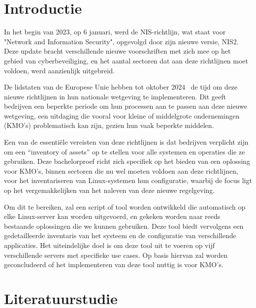 
\section{Introductie}%
\label{sec:introductie}

In het begin van 2023, op 6 januari, werd de NIS-richtlijn, wat staat voor "Network and Information Security", opgevolgd door zijn nieuwe versie, NIS2.
Deze update bracht verschillende nieuwe voorschriften met zich mee op het gebied van cyberbeveiliging, en het aantal sectoren dat aan deze richtlijnen moet voldoen, werd aanzienlijk uitgebreid.

De lidstaten van de Europese Unie hebben tot oktober 2024~\autocite{NIS2Directive2022} de tijd om deze nieuwe richtlijnen in hun nationale wetgeving te implementeren.
Dit geeft bedrijven een beperkte periode om hun processen aan te passen aan deze nieuwe wetgeving, een uitdaging die vooral voor kleine of middelgrote ondernemingen (KMO's) problematisch kan zijn, gezien hun vaak beperkte middelen.

Een van de essenti\"ele vereisten van deze richtlijnen is dat bedrijven verplicht zijn om een ``inventory of assets'' op te stellen voor alle systemen en operaties die ze gebruiken.
Deze bachelorproef richt zich specifiek op het bieden van een oplossing voor KMO's, binnen sectoren die nu wel moeten voldoen aan deze richtlijnen, voor het inventariseren van Linux-systemen hun configuratie, waarbij de focus ligt op het vergemakkelijken van het naleven van deze nieuwe regelgeving.

Om dit te bereiken, zal een script of tool worden ontwikkeld die automatisch op elke Linux-server kan worden uitgevoerd, en gekeken worden naar reeds bestaande oplossingen die we kunnen gebruiken.
Deze tool biedt vervolgens een gedetailleerde inventaris van het systeem en de configuratie van verschillende applicaties.
Het uiteindelijke doel is om deze tool uit te voeren op vijf verschillende servers met specifieke use cases.
Op basis hiervan zal worden geconcludeerd of het implementeren van deze tool nuttig is voor KMO's.


\section{Literatuurstudie}%
\label{sec:litaratuurstudie}

